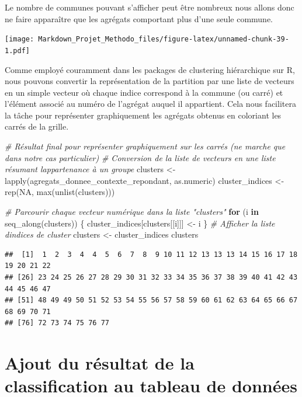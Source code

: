 \documentclass[
]{article}
\newenvironment{Shaded}{\begin{snugshade}}{\end{snugshade}}
\newcommand{\CommentTok}[1]{\textcolor[rgb]{0.56,0.35,0.01}{\textit{#1}}}
\newcommand{\ConstantTok}[1]{\textcolor[rgb]{0.00,0.00,0.00}{#1}}
\newcommand{\ControlFlowTok}[1]{\textcolor[rgb]{0.13,0.29,0.53}{\textbf{#1}}}
\newcommand{\FunctionTok}[1]{\textcolor[rgb]{0.00,0.00,0.00}{#1}}
\newcommand{\NormalTok}[1]{#1}
\newcommand{\OtherTok}[1]{\textcolor[rgb]{0.56,0.35,0.01}{#1}}
\begin{document}
Le nombre de communes pouvant s'afficher peut être nombreux nous allons
donc ne faire apparaître que les agrégats comportant plus d'une seule
commune.

\texttt{[image: Markdown\_Projet\_Methodo\_files/figure-latex/unnamed-chunk-39-1.pdf]}

Comme employé couramment dans les packages de clustering hiérarchique
sur R, nous pouvons convertir la représentation de la partition par une
liste de vecteurs en un simple vecteur où chaque indice correspond à la
commune (ou carré) et l'élément associé au numéro de l'agrégat auquel il
appartient. Cela nous facilitera la tâche pour représenter graphiquement
les agrégats obtenus en coloriant les carrés de la grille.

\begin{Shaded}
\begin{Highlighting}[]
\CommentTok{\# Résultat final pour représenter graphiquement sur les carrés (ne marche que dans notre cas particulier)}
\CommentTok{\# Conversion de la liste de vecteurs en une liste résumant l\textquotesingle{}appartenance à un groupe}
\NormalTok{clusters }\OtherTok{\textless{}{-}} \FunctionTok{lapply}\NormalTok{(agregats\_donnee\_contexte\_repondant, as.numeric)}
\NormalTok{cluster\_indices }\OtherTok{\textless{}{-}} \FunctionTok{rep}\NormalTok{(}\ConstantTok{NA}\NormalTok{, }\FunctionTok{max}\NormalTok{(}\FunctionTok{unlist}\NormalTok{(clusters)))}

\CommentTok{\# Parcourir chaque vecteur numérique dans la liste "clusters"}
\ControlFlowTok{for}\NormalTok{ (i }\ControlFlowTok{in} \FunctionTok{seq\_along}\NormalTok{(clusters)) \{}
\NormalTok{  cluster\_indices[clusters[[i]]] }\OtherTok{\textless{}{-}}\NormalTok{ i}
\NormalTok{\}}
\CommentTok{\# Afficher la liste d\textquotesingle{}indices de cluster}
\NormalTok{clusters }\OtherTok{\textless{}{-}}\NormalTok{ cluster\_indices }
\NormalTok{clusters}
\end{Highlighting}
\end{Shaded}

\begin{verbatim}
##  [1]  1  2  3  4  4  5  6  7  8  9 10 11 12 13 13 13 14 15 16 17 18 19 20 21 22
## [26] 23 24 25 26 27 28 29 30 31 32 33 34 35 36 37 38 39 40 41 42 43 44 45 46 47
## [51] 48 49 49 50 51 52 53 54 55 56 57 58 59 60 61 62 63 64 65 66 67 68 69 70 71
## [76] 72 73 74 75 76 77
\end{verbatim}

\hypertarget{ajout-du-ruxe9sultat-de-la-classification-au-tableau-de-donnuxe9es}{%
\section{Ajout du résultat de la classification au tableau de
données}\label{ajout-du-ruxe9sultat-de-la-classification-au-tableau-de-donnuxe9es}}
\end{document}
